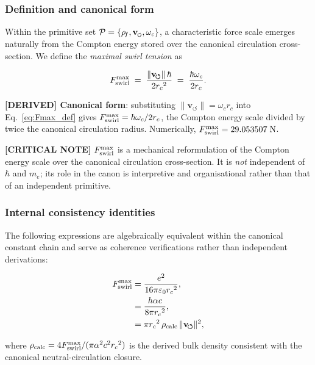 \documentclass[11pt]{article}
\theoremstyle{definition}
\theoremstyle{plain}
\theoremstyle{remark}
\newcommand{\swirlarrow}{\mathchoice{\mkern-2mu\scriptstyle\boldsymbol{\circlearrowleft}}{\mkern-2mu\scriptstyle\boldsymbol{\circlearrowleft}}{\mkern-2mu\scriptscriptstyle\boldsymbol{\circlearrowleft}}{\mkern-2mu\scriptscriptstyle\boldsymbol{\circlearrowleft}}}
\newcommand{\vswirl}{\mathbf{v}_{\swirlarrow}}
\newcommand{\rhoF}{{\rho_{\!f}}}
\newcommand{\rc}{{r_c}}
\newcommand{\vnorm}{\lVert \mathbf{v}_{\!\boldsymbol{\circlearrowleft}} \rVert}
\begin{document}
        \subsubsection{Definition and canonical form}

        Within the primitive set $\mathcal{P} = \{\rhoF, \vswirl, \omega_c\}$, a characteristic force scale emerges naturally from the Compton energy stored over the canonical circulation cross-section. We define the \emph{maximal swirl tension} as

        \begin{align}
            F_{\rm swirl}^{\max}
            \;=\; \frac{\vnorm\,\hbar}{2\rc^2}
            \;=\; \frac{\hbar\omega_c}{2\rc}.
            \label{eq:Fmax_def}
        \end{align}

        \textbf{[DERIVED] Canonical form}: substituting $\vnorm = \omega_c \rc$ into Eq.~\eqref{eq:Fmax_def} gives $F_{\rm swirl}^{\max} = \hbar\omega_c/2\rc$, the Compton energy scale divided by twice the canonical circulation radius. Numerically, $F_{\rm swirl}^{\max} = 29.053507\;\text{N}$.

        \textbf{[CRITICAL NOTE]} $F_{\rm swirl}^{\max}$ is a mechanical reformulation of the Compton energy scale over the canonical circulation cross-section. It is \emph{not} independent of $\hbar$ and $m_e$; its role in the canon is interpretive and organisational rather than that of an independent primitive.

        \subsubsection{Internal consistency identities}

        The following expressions are algebraically equivalent within the canonical constant chain and serve as coherence verifications rather than independent derivations:

        \begin{align}
            F_{\rm swirl}^{\max}
            &= \frac{e^2}{16\pi\varepsilon_0 \rc^2},
            \label{eq:Fmax_em}\\
            &= \frac{h\alpha c}{8\pi \rc^2},
            \label{eq:Fmax_hac}\\
            &= \pi \rc^2\,\rho_{\rm calc}\,\vnorm^2,
            \label{eq:Fmax_rho}
        \end{align}

        where $\rho_{\rm calc} = 4F_{\rm swirl}^{\max}/(\pi\alpha^2 c^2 \rc^2)$ is the derived bulk density consistent with the canonical neutral-circulation closure.
\end{document}
